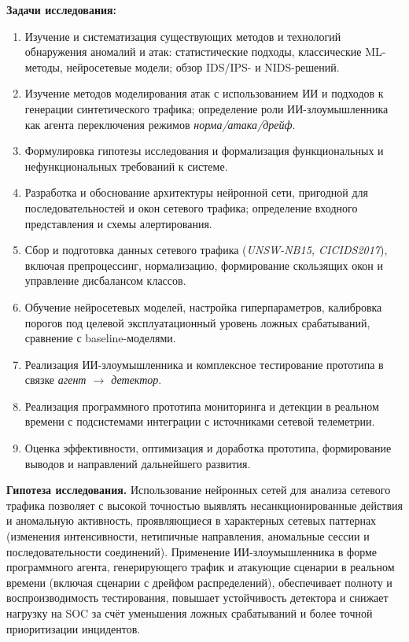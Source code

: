 \textbf{Задачи исследования:}
\begin{enumerate}
    \item Изучение и систематизация существующих методов и технологий
    обнаружения аномалий и атак: статистические подходы, классические
    ML-методы, нейросетевые модели; обзор IDS/IPS- и NIDS-решений.
    \item Изучение методов моделирования атак с использованием ИИ и
    подходов к генерации синтетического трафика; определение роли
    ИИ-злоумышленника как агента переключения режимов
    \emph{норма/атака/дрейф}.
    \item Формулировка гипотезы исследования и формализация
    функциональных и нефункциональных требований к системе.
    \item Разработка и обоснование архитектуры нейронной сети,
    пригодной для последовательностей и окон сетевого трафика;
    определение входного представления и схемы алертирования.
    \item Сбор и подготовка данных сетевого трафика
    (\emph{UNSW-NB15, CICIDS2017}), включая препроцессинг,
    нормализацию, формирование скользящих окон и управление
    дисбалансом классов.
    \item Обучение нейросетевых моделей, настройка гиперпараметров,
    калибровка порогов под целевой эксплуатационный уровень ложных
    срабатываний, сравнение с baseline-моделями.
    \item Реализация ИИ-злоумышленника и комплексное тестирование
    прототипа в связке \emph{агент $\to$ детектор}.
    \item Реализация программного прототипа мониторинга и детекции
    в реальном времени с подсистемами интеграции с источниками
    сетевой телеметрии.
    \item Оценка эффективности, оптимизация и доработка прототипа,
    формирование выводов и направлений дальнейшего развития.
\end{enumerate}

\textbf{Гипотеза исследования.} Использование нейронных сетей для
анализа сетевого трафика позволяет с высокой точностью выявлять
несанкционированные действия и аномальную активность, проявляющиеся в
характерных сетевых паттернах (изменения интенсивности, нетипичные
направления, аномальные сессии и последовательности соединений).
Применение ИИ-злоумышленника в форме программного агента,
генерирующего трафик и атакующие сценарии в реальном времени (включая
сценарии с дрейфом распределений), обеспечивает полноту и
воспроизводимость тестирования, повышает устойчивость детектора и
снижает нагрузку на SOC за счёт уменьшения ложных срабатываний и
более точной приоритизации инцидентов.

